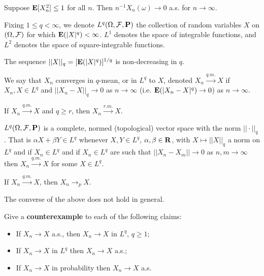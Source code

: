 \begin{proposition*} 
Suppose $\mathbf{E}[X_n^2] \le 1$ for all $n$. Then $n^{-1} X_n(\omega) \rightarrow 0$
a.s. for $n\rightarrow \infty$.
\end{proposition*} 

\begin{definition*} 
Fixing $1 \le q < \infty$, we denote $L^q(\Omega, \mathcal{F}, \mathbf{P})$ the collection of
random variables $X$ on $(\Omega, \mathcal{F})$ for which $\mathbf{E}(|X|^q) < \infty$.
$L^1$ denotes the space of integrable functions, and $L^2$ denotes the space of
square-integrable functions.
\end{definition*}

\begin{proposition*} 
The sequence $||X||_q = [\mathbf{E}(|X|^q)]^{1/q}$ is non-decreasing in $q$.
\end{proposition*} 

\begin{definition*} 
We say that $X_n$ converges in $q$-mean, or in $L^q$ to $X$, denoted
$X_n \xrightarrow{q.m.} X$ if $X_n, X \in L^q$ and $||X_n - X||_q \rightarrow 0$
as $n\rightarrow \infty$ (i.e. $\mathbf{E}(|X_n - X|^q) \rightarrow 0$) as $n\rightarrow
\infty$.
\end{definition*} 

\begin{corollary*} 
If $X_n \xrightarrow{q.m.} X$ and $q \ge r$, then $X_n \xrightarrow{r.m.} X$.
\end{corollary*} 

\begin{proposition*} 
$L^q(\Omega, \mathcal{F}, \mathbf{P})$ is a complete, normed (topological) vector space with the
norm $||\cdot||_q$. That is $\alpha X + \beta Y \in L^q$ whenever $X, Y \in
L^q$, $\alpha, \beta \in \mathbf{R}$, with $X \mapsto ||X||_q$ a norm on $L^q$ and if $X_n
\in L^q$ and if $X_n \in L^q$ are such that $||X_n - X_m|| \rightarrow 0$ as
$n, m \rightarrow \infty$ then $X_n \xrightarrow{q.m.} X$ for some $X \in L^q$.
\end{proposition*}

\begin{proposition*} 
If $X_n \xrightarrow{q.m.} X$, then $X_n \rightarrow_p X$.
\end{proposition*} 

\begin{example*} 
The converse of the above does not hold in general.
\end{example*} 

\begin{exercise*}
Give a \textbf{counterexample} to each of the following claims:
\begin{itemize}
\item If $X_n \rightarrow X$ a.s., then $X_n \rightarrow X$ in $L^q$, $q \ge 1$;
\item If $X_n \rightarrow X$ in $L^q$ then $X_n \rightarrow X$ a.s.;
\item If $X_n \rightarrow X$ in probability then $X_n \rightarrow X$ a.s.
\end{itemize}
\end{exercise*}

